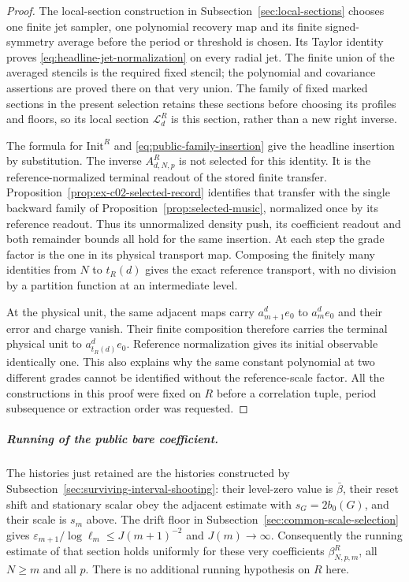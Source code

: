 \begin{proof}
The local-section construction in Subsection~\ref{sec:local-sections}
chooses one finite jet sampler, one polynomial recovery map and its
finite signed-symmetry average before the period or threshold is
chosen. Its Taylor identity proves
\eqref{eq:headline-jet-normalization} on every radial jet. The finite
union of the averaged stencils is the required fixed stencil; the
polynomial and covariance assertions are proved there on that very
union. The family of fixed marked sections in the present selection retains these sections
before choosing its profiles and floors, so its local section
$\mathcal L^R_d$ is this section, rather than a new right inverse.

The formula for $\mathrm{Init}^R$ and
\eqref{eq:public-family-insertion} give the headline insertion by
substitution. The inverse $A^R_{d,N,p}$ is not selected for this
identity. It is the reference-normalized terminal readout of the
stored finite transfer. Proposition~\ref{prop:ex-c02-selected-record}
identifies that transfer with the single backward family of
Proposition~\ref{prop:selected-music}, normalized once by its
reference readout. Thus its unnormalized density push, its
coefficient readout and both remainder bounds all hold for the same
insertion. At each step the grade factor is the one in its physical
transport map. Composing the finitely many identities from $N$ to
$t_R(d)$ gives the exact reference transport, with no division by a
partition function at an intermediate level.

At the physical unit, the same adjacent maps carry
$a_{m+1}^de_0$ to $a_m^de_0$ and their error and charge vanish.
Their finite composition therefore carries the terminal physical
unit to $a_{t_R(d)}^de_0$. Reference normalization gives its initial
observable identically one. This also explains why the same
constant polynomial at two different grades cannot be identified
without the reference-scale factor. All the constructions in this
proof were fixed on $R$ before a correlation tuple, period
subsequence or extraction order was requested.
\end{proof}

\subparagraph{Running of the public bare coefficient.}
The histories just retained are the histories constructed by
Subsection~\ref{sec:surviving-interval-shooting}: their level-zero value is
$\bar\beta$, their reset shift and stationary scalar obey the adjacent
estimate with $s_G=2b_0(G)$, and their scale is $s_m$ above.
The drift floor in Subsection~\ref{sec:common-scale-selection} gives
$\varepsilon_{m+1}/\log\ell_m\le J(m+1)^{-2}$ and $J(m)\to\infty$.
Consequently the running estimate of that section holds uniformly for
these very coefficients $\beta^R_{N,p,m}$, all $N\ge m$ and all $p$.
There is no additional running hypothesis on $R$ here.

